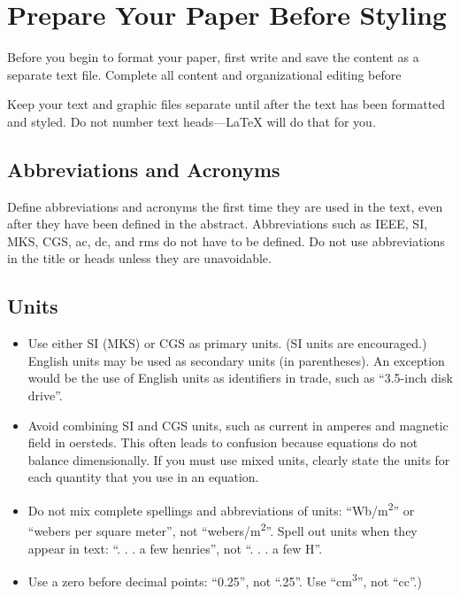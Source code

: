\documentclass[conference]{IEEEtran}
\begin{document}
\section{Prepare Your Paper Before Styling}
Before you begin to format your paper, first write and save the content as a 
separate text file. Complete all content and organizational editing before 

Keep your text and graphic files separate until after the text has been 
formatted and styled. Do not number text heads---{\LaTeX} will do that 
for you.

\subsection{Abbreviations and Acronyms}\label{AA}
Define abbreviations and acronyms the first time they are used in the text, 
even after they have been defined in the abstract. Abbreviations such as 
IEEE, SI, MKS, CGS, ac, dc, and rms do not have to be defined. Do not use 
abbreviations in the title or heads unless they are unavoidable.

\subsection{Units}
\begin{itemize}
\item Use either SI (MKS) or CGS as primary units. (SI units are encouraged.) English units may be used as secondary units (in parentheses). An exception would be the use of English units as identifiers in trade, such as ``3.5-inch disk drive''.
\item Avoid combining SI and CGS units, such as current in amperes and magnetic field in oersteds. This often leads to confusion because equations do not balance dimensionally. If you must use mixed units, clearly state the units for each quantity that you use in an equation.
\item Do not mix complete spellings and abbreviations of units: ``Wb/m\textsuperscript{2}'' or ``webers per square meter'', not ``webers/m\textsuperscript{2}''. Spell out units when they appear in text: ``. . . a few henries'', not ``. . . a few H''.
\item Use a zero before decimal points: ``0.25'', not ``.25''. Use ``cm\textsuperscript{3}'', not ``cc''.)
\end{itemize}
\end{document}
